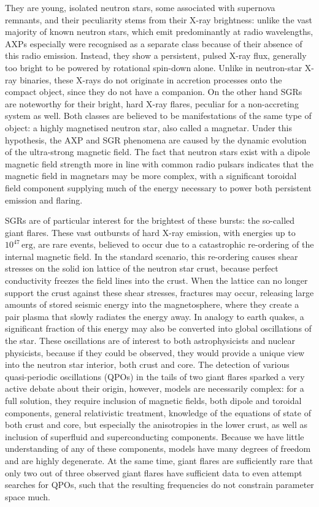 \documentclass[numberedappendix]{emulateapj}
\begin{document}
They are young, isolated neutron stars, some associated with supernova remnants, and their peculiarity stems from their X-ray brightness: unlike the vast majority of known neutron stars, which emit predominantly at radio wavelengths, AXPs especially were recognised as a separate class because of their absence of this radio emission. Instead, they show a persistent, pulsed X-ray flux, generally too bright to be powered by rotational spin-down alone. Unlike in neutron-star X-ray binaries, these X-rays do not originate in accretion processes onto the compact object, since they do not have a companion. On the other hand SGRs are noteworthy for their bright, hard X-ray flares, peculiar for a non-accreting system as well. Both classes are believed to be manifestations of the same type of object: a highly magnetised neutron star, also called a magnetar. Under this hypothesis, the AXP and SGR phenomena are caused by the dynamic evolution of the ultra-strong magnetic field. The fact that neutron stars exist with a dipole magnetic field strength more in line with common radio pulsars indicates that the magnetic field in magnetars may be more complex, with a significant toroidal field component supplying much of the energy necessary to power both persistent emission and flaring.

SGRs are of particular interest for the brightest of these bursts: the so-called giant flares. These vast outbursts of hard X-ray emission, with energies up to $10^{47}\,\mathrm{erg}$, are rare events, believed to occur due to a catastrophic re-ordering of the internal magnetic field. In the standard scenario, this re-ordering causes shear stresses on the solid ion lattice of the neutron star crust, because perfect conductivity freezes the field lines into the crust. When the lattice can no longer support the crust against these shear stresses, fractures may occur, releasing large amounts of stored seismic energy into the magnetosphere, where they create a pair plasma that slowly radiates the energy away. In analogy to earth quakes, a significant fraction of this energy may also be converted into global oscillations of the star. These oscillations are of interest to both astrophysicists and nuclear physicists, because if they could be observed, they would provide a unique view into the neutron star interior, both crust and core. The detection of various quasi-periodic oscillations (QPOs) in the tails of two giant flares sparked a very active debate about their origin, however, models are necessarily complex: for a full solution, they require inclusion of magnetic fields, both dipole and toroidal components, general relativistic treatment, knowledge of the equations of state of both crust and core, but especially the anisotropies in the lower crust, as well as inclusion of superfluid and superconducting components. Because we have little understanding of any of these components, models have many degrees of freedom and are highly degenerate. At the same time, giant flares are sufficiently rare that only two out of three observed giant flares have sufficient data to even attempt searches for QPOs, such that the resulting frequencies do not constrain parameter space much.
\end{document}

